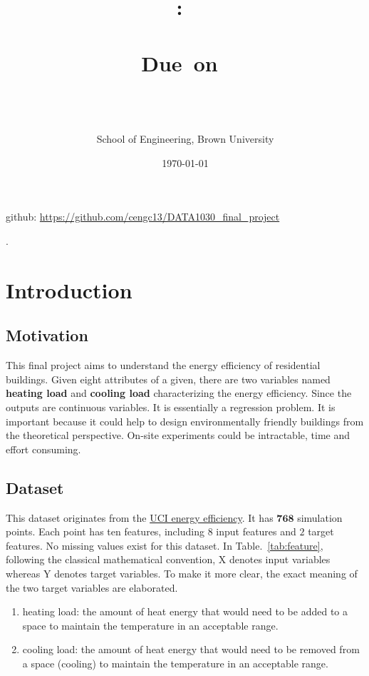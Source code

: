 \documentclass{article}
\title{
\vspace{2in}
\textmd{\hmwkClass:\ \preTitle \\ \textbf{\hmwkTitle}}\\
\normalsize\vspace{0.1in}\small{Due\ on\ \hmwkDueDate}\\
\vspace{0.1in}\large{\textit{\hmwkClassInstructor}}\\
\vspace{0.1in}\large{\hmwkClassTime}
\vspace{3in}
}
\author{\vspace{0.2in} \textbf{\hmwkAuthorName} \\
School of Engineering, Brown University}
\date{\today } %
\begin{document}
\maketitle

\hfil github: \href{https://github.com/cengc13/DATA1030_final_project}{https://github.com/cengc13/DATA1030\_final\_project} \par.

\setlength{\parskip}{1em}

\section{Introduction \label{sec:intro}}
\subsection{Motivation}
This final project aims to understand the energy efficiency of residential buildings. Given eight attributes of a given, there are two variables named \textbf{heating load} and \textbf{cooling load} characterizing the energy efficiency. Since the outputs are continuous variables. It is essentially a regression problem. It is important because it could help to design environmentally friendly buildings from the theoretical perspective.  On-site experiments could be intractable, time and effort consuming. 


\subsection{Dataset}
This dataset originates from the \href{https://archive.ics.uci.edu/ml/datasets/Energy+efficiency}{UCI energy efficiency}. It has $\mathbf{768}$ simulation points. Each point has ten features, including $8$ input features and $2$ target features. No missing values exist for this dataset. In Table.~\ref{tab:feature}, following the classical mathematical convention, X denotes input variables whereas Y denotes target variables. To make it more clear, the exact meaning of the two target variables are elaborated.

\begin{enumerate}
	\item[\bullet] heating load: the amount of heat energy that would need to be added to a space to maintain the temperature in an acceptable range.

	\item[\bullet] cooling load: the amount of heat energy that would need to be removed from a space (cooling) to maintain the temperature in an acceptable range.
\end{enumerate}
\end{document}
